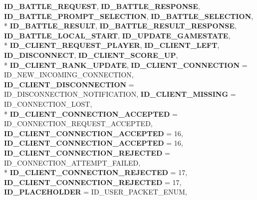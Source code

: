\begin{DoxyCompactItemize}
{\bfseries I\-D\-\_\-\-B\-A\-T\-T\-L\-E\-\_\-\-R\-E\-Q\-U\-E\-S\-T}, 
{\bfseries I\-D\-\_\-\-B\-A\-T\-T\-L\-E\-\_\-\-R\-E\-S\-P\-O\-N\-S\-E}, 
{\bfseries I\-D\-\_\-\-B\-A\-T\-T\-L\-E\-\_\-\-P\-R\-O\-M\-P\-T\-\_\-\-S\-E\-L\-E\-C\-T\-I\-O\-N}, 
{\bfseries I\-D\-\_\-\-B\-A\-T\-T\-L\-E\-\_\-\-S\-E\-L\-E\-C\-T\-I\-O\-N}, 
\\*
{\bfseries I\-D\-\_\-\-B\-A\-T\-T\-L\-E\-\_\-\-R\-E\-S\-U\-L\-T}, 
{\bfseries I\-D\-\_\-\-B\-A\-T\-T\-L\-E\-\_\-\-R\-E\-S\-U\-L\-T\-\_\-\-R\-E\-S\-P\-O\-N\-S\-E}, 
{\bfseries I\-D\-\_\-\-B\-A\-T\-T\-L\-E\-\_\-\-L\-O\-C\-A\-L\-\_\-\-S\-T\-A\-R\-T}, 
{\bfseries I\-D\-\_\-\-U\-P\-D\-A\-T\-E\-\_\-\-G\-A\-M\-E\-S\-T\-A\-T\-E}, 
\\*
{\bfseries I\-D\-\_\-\-C\-L\-I\-E\-N\-T\-\_\-\-R\-E\-Q\-U\-E\-S\-T\-\_\-\-P\-L\-A\-Y\-E\-R}, 
{\bfseries I\-D\-\_\-\-C\-L\-I\-E\-N\-T\-\_\-\-L\-E\-F\-T}, 
{\bfseries I\-D\-\_\-\-D\-I\-S\-C\-O\-N\-N\-E\-C\-T}, 
{\bfseries I\-D\-\_\-\-C\-L\-I\-E\-N\-T\-\_\-\-S\-C\-O\-R\-E\-\_\-\-U\-P}, 
\\*
{\bfseries I\-D\-\_\-\-C\-L\-I\-E\-N\-T\-\_\-\-R\-A\-N\-K\-\_\-\-U\-P\-D\-A\-T\-E}, 
{\bfseries I\-D\-\_\-\-C\-L\-I\-E\-N\-T\-\_\-\-C\-O\-N\-N\-E\-C\-T\-I\-O\-N} = I\-D\-\_\-\-N\-E\-W\-\_\-\-I\-N\-C\-O\-M\-I\-N\-G\-\_\-\-C\-O\-N\-N\-E\-C\-T\-I\-O\-N, 
{\bfseries I\-D\-\_\-\-C\-L\-I\-E\-N\-T\-\_\-\-D\-I\-S\-C\-O\-N\-N\-E\-C\-T\-I\-O\-N} = I\-D\-\_\-\-D\-I\-S\-C\-O\-N\-N\-E\-C\-T\-I\-O\-N\-\_\-\-N\-O\-T\-I\-F\-I\-C\-A\-T\-I\-O\-N, 
{\bfseries I\-D\-\_\-\-C\-L\-I\-E\-N\-T\-\_\-\-M\-I\-S\-S\-I\-N\-G} = I\-D\-\_\-\-C\-O\-N\-N\-E\-C\-T\-I\-O\-N\-\_\-\-L\-O\-S\-T, 
\\*
{\bfseries I\-D\-\_\-\-C\-L\-I\-E\-N\-T\-\_\-\-C\-O\-N\-N\-E\-C\-T\-I\-O\-N\-\_\-\-A\-C\-C\-E\-P\-T\-E\-D} = I\-D\-\_\-\-C\-O\-N\-N\-E\-C\-T\-I\-O\-N\-\_\-\-R\-E\-Q\-U\-E\-S\-T\-\_\-\-A\-C\-C\-E\-P\-T\-E\-D, 
{\bfseries I\-D\-\_\-\-C\-L\-I\-E\-N\-T\-\_\-\-C\-O\-N\-N\-E\-C\-T\-I\-O\-N\-\_\-\-A\-C\-C\-E\-P\-T\-E\-D} = 16, 
{\bfseries I\-D\-\_\-\-C\-L\-I\-E\-N\-T\-\_\-\-C\-O\-N\-N\-E\-C\-T\-I\-O\-N\-\_\-\-A\-C\-C\-E\-P\-T\-E\-D} = 16, 
{\bfseries I\-D\-\_\-\-C\-L\-I\-E\-N\-T\-\_\-\-C\-O\-N\-N\-E\-C\-T\-I\-O\-N\-\_\-\-R\-E\-J\-E\-C\-T\-E\-D} = I\-D\-\_\-\-C\-O\-N\-N\-E\-C\-T\-I\-O\-N\-\_\-\-A\-T\-T\-E\-M\-P\-T\-\_\-\-F\-A\-I\-L\-E\-D, 
\\*
{\bfseries I\-D\-\_\-\-C\-L\-I\-E\-N\-T\-\_\-\-C\-O\-N\-N\-E\-C\-T\-I\-O\-N\-\_\-\-R\-E\-J\-E\-C\-T\-E\-D} = 17, 
{\bfseries I\-D\-\_\-\-C\-L\-I\-E\-N\-T\-\_\-\-C\-O\-N\-N\-E\-C\-T\-I\-O\-N\-\_\-\-R\-E\-J\-E\-C\-T\-E\-D} = 17, 
{\bfseries I\-D\-\_\-\-P\-L\-A\-C\-E\-H\-O\-L\-D\-E\-R} = I\-D\-\_\-\-U\-S\-E\-R\-\_\-\-P\-A\-C\-K\-E\-T\-\_\-\-E\-N\-U\-M, 

\end{DoxyCompactItemize}

